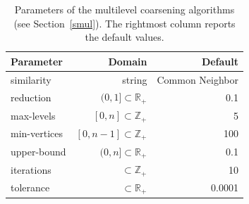 \documentclass[runningheads]{llncs}
\begin{document}
\begin{table}[!ht]
    \centering
	\caption{Parameters of the multilevel coarsening algorithms (see Section~\ref{smul}). The rightmost column reports the default values. }
	\label{tab:parameters}
 	\renewcommand{\arraystretch}{1.3}
 	\renewcommand{\tabcolsep}{0.45cm}
    \begin{tabular}{lrr}
    	\textbf{Parameter} & \textbf{Domain} & \textbf{Default} \\
    	\hline
    	similarity & string & Common Neighbor \\
        reduction & $(0,1] \subset \mathbb{R}_+$ & 0.1 \\
        max-levels & $[0,n] \subset \mathbb{Z}_+$ & 5 \\
        min-vertices & $[0,n-1] \subset \mathbb{Z}_+$ & 100 \\
        upper-bound & $(0,n] \subset \mathbb{R}_+$ & 0.1 \\
        iterations & $\subset \mathbb{Z}_+$ & 10 \\
        tolerance & $\subset \mathbb{R}_+$ & 0.0001 \\
    \end{tabular}
\end{table}

\null
\vfill
\end{document}
